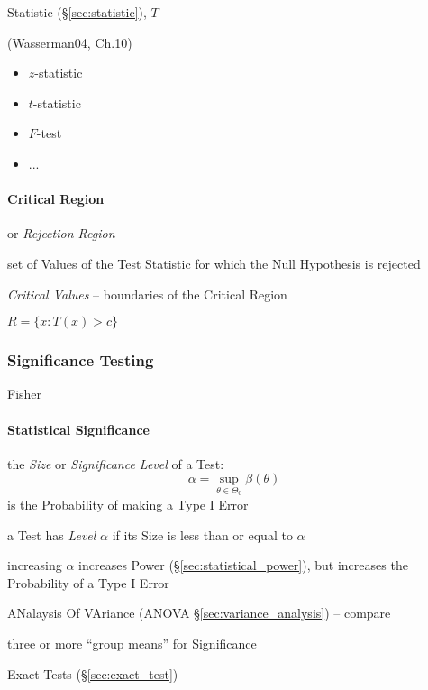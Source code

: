 Statistic (\S\ref{sec:statistic}), $T$

(Wasserman04, Ch.10)

\begin{itemize}
  \item $z$-statistic
  \item $t$-statistic
  \item $F$-test
  \item ...
\end{itemize}



\paragraph{Critical Region}\label{sec:critical_region}\hfill

or \emph{Rejection Region}

set of Values of the Test Statistic for which the Null Hypothesis is rejected

\emph{Critical Values} -- boundaries of the Critical Region

$R = \{ x : T(x) > c \}$



\subsubsection{Significance Testing}\label{sec:significance_testing}

Fisher



\paragraph{Statistical Significance}\label{sec:statistical_significance}\hfill

the \emph{Size} or \emph{Significance Level} of a Test:
\[
  \alpha = \sup_{\theta \in \Theta_0} \beta(\theta)
\]
is the Probability of making a Type I Error

a Test has \emph{Level} $\alpha$ if its Size is less than or equal to $\alpha$

increasing $\alpha$ increases Power (\S\ref{sec:statistical_power}), but
increases the Probability of a Type I Error

\fist ANalaysis Of VAriance (ANOVA \S\ref{sec:variance_analysis}) -- compare

three or more ``group means'' for Significance

Exact Tests (\S\ref{sec:exact_test})



